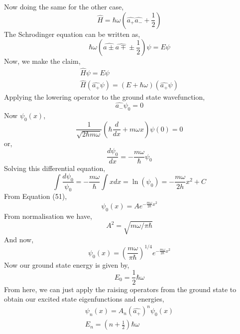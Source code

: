 					Now doing the same for the other case,
			\begin{equation}
				\hat{H}=\hbar\omega \left(\hat{a_+}\hat{a_-}+\frac{1}{2}\right)
			\end{equation}
			The Schrodinger equation can be written as,
			\begin{equation}
				\hbar\omega\left(\hat{a\pm}\hat{a\mp}\pm\frac{1}{2}\right)\psi=E\psi
			\end{equation}
			Now, we make the claim,
			\begin{gather*}
				\hat{H}\psi=E\psi \\
				\hat{H}(\hat{a_+}\psi)=(E+\hbar\omega)(\hat{a_+}\psi)
			\end{gather*}
			Applying the lowering operator to the ground state wavefunction,
			\begin{equation}
				\hat{a_-}\psi_0=0
			\end{equation}
			Now $\psi_0(x)$,
			\begin{equation}
				\frac{1}{\sqrt{2\hbar m\omega}}\left(\hbar \frac{d}{dx}+m\omega x\right)\psi(0)=0
			\end{equation}
			or,
			\begin{equation}
				\frac{d\psi_0}{dx}=-\frac{m\omega}{\hbar}\psi_0
			\end{equation}
		Solving this differential equation,
		\begin{equation}
			\int\frac{d\psi_0}{\psi_0}=-\frac{m\omega}{\hbar}\int xdx=\ln(\psi_0)=-\frac{m\omega}{2h}x^2+C
		\end{equation}
		From Equation (51),
			\begin{equation}
				\psi_0(x)=Ae^{-\frac{m\omega}{2\hbar}x^2}
			\end{equation}
			From normalisation we have,
			\begin{equation}
				A^2=\sqrt{m\omega/\pi\hbar}
			\end{equation}
			And now,
			\begin{equation}
				\psi_0(x)=\left(\frac{m\omega}{\pi\hbar}\right)^{1/4}e^{-\frac{m\omega}{2\hbar}x^2}
			\end{equation}
			Now our ground state energy is given by,
			\begin{equation}
				E_0=\frac{1}{2}\hbar\omega
			\end{equation}
				From here, we can just apply the raising operators from the ground state to obtain our excited state eigenfunctions and energies,
			\begin{gather}
				\psi_n(x)=A_n(\hat{a_+})^n\psi_0(x)\\
				E_n=\left(n+\frac{1}{2}\right)\hbar\omega
			\end{gather}
